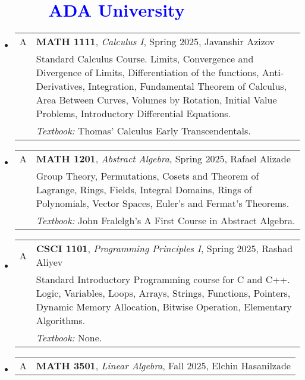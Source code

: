\documentclass[12pt]{article}
\begin{document}
\section*{\textcolor{blue}{\ \ \ \ \  ADA University}}
\begin{itemize}[leftmargin = *]
    \item[]
        \begin{tabularx}{\textwidth}{@{}lX@{}}
            A & \textbf{MATH 1111}, \textit{Calculus I}, Spring 2025, Javanshir Azizov
            \\
            & Standard Calculus Course. Limits, Convergence and Divergence of Limits, Differentiation of the functions, Anti-Derivatives,
            Integration, Fundamental Theorem of Calculus, Area Between Curves, Volumes by Rotation, Initial Value Problems, Introductory
            Differential Equations.
            \\
            & \textit{Textbook:} Thomas’ Calculus Early Transcendentals.
        \end{tabularx}
    \item[]
        \begin{tabularx}{\textwidth}{@{}lX@{}}
            A & \textbf{MATH 1201}, \textit{Abstract Algebra}, Spring 2025, Rafael Alizade
            \\
            & Group Theory, Permutations, Cosets and Theorem of Lagrange, Rings, Fields, Integral Domains, Rings of Polynomials, Vector
            Spaces, Euler's and Fermat's Theorems.
            \\
            & \textit{Textbook:} John Fralelgh's A First Course in Abstract Algebra.
        \end{tabularx}
    \item[]
        \begin{tabularx}{\textwidth}{@{}lX@{}}
            A & \textbf{CSCI 1101}, \textit{Programming Principles I}, Spring 2025, Rashad Aliyev
            \\
            & Standard Introductory Programming course for C and C++. Logic, Variables, Loops, Arrays, Strings, Functions, Pointers,
            Dynamic Memory Allocation, Bitwise Operation, Elementary Algorithms.
            \\
            & \textit{Textbook:} None.
        \end{tabularx}
    \item[]
        \begin{tabularx}{\textwidth}{@{}lX@{}}
            A & \textbf{MATH 3501}, \textit{Linear Algebra}, Fall 2025, Elchin Hasanilzade

\end{tabularx}
\end{itemize}
\end{document}
